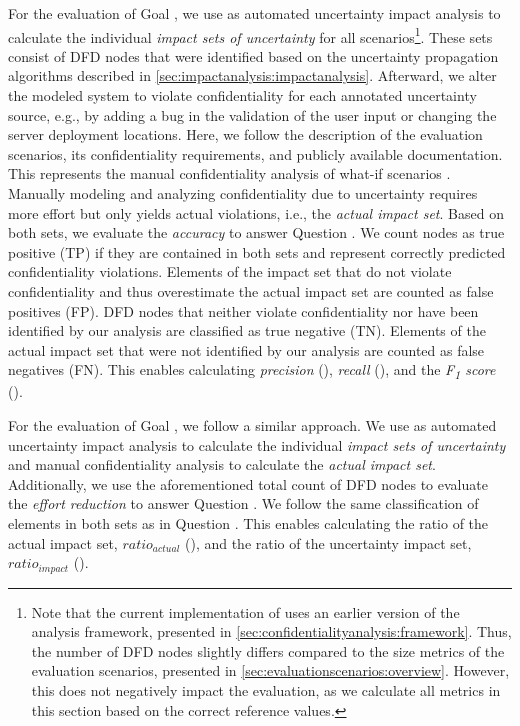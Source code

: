 For the evaluation of Goal , we use \uia as automated uncertainty impact analysis to calculate the individual \emph{impact sets of uncertainty} for all scenarios\footnote{Note that the current implementation of \uia uses an earlier version of the analysis framework, presented in \autoref{sec:confidentialityanalysis:framework}. Thus, the number of \ac{DFD} nodes slightly differs compared to the size metrics of the evaluation scenarios, presented in \autoref{sec:evaluationscenarios:overview}. However, this does not negatively impact the evaluation, as we calculate all metrics in this section based on the correct reference values.}.
These sets consist of \ac{DFD} nodes that were identified based on the uncertainty propagation algorithms described in \autoref{sec:impactanalysis:impactanalysis}.
Afterward, we alter the modeled system to violate confidentiality for each annotated uncertainty source, e.g., by adding a bug in the validation of the user input or changing the server deployment locations.
Here, we follow the description of the evaluation scenarios, its confidentiality requirements, and publicly available documentation.
This represents the manual confidentiality analysis of what-if scenarios \cite{seifermann_architectural_2022}.
Manually modeling and analyzing confidentiality due to uncertainty requires more effort \cite{hahner_model-based_2023} but only yields actual violations, i.e., the \emph{actual impact set}.
Based on both sets, we evaluate the \emph{accuracy} to answer Question .
We count nodes as true positive (TP) if they are contained in both sets and represent correctly predicted confidentiality violations. 
Elements of the impact set that do not violate confidentiality and thus overestimate the actual impact set are counted as false positives (FP). 
\ac{DFD} nodes that neither violate confidentiality nor have been identified by our analysis are classified as true negative (TN). 
Elements of the actual impact set that were not identified by our analysis are counted as false negatives (FN).
This enables calculating \emph{precision} (), \emph{recall} (), and the \emph{F\textsubscript{1} score} ().

For the evaluation of Goal , we follow a similar approach.
We use \uia as automated uncertainty impact analysis to calculate the individual \emph{impact sets of uncertainty} and manual confidentiality analysis \cite{seifermann_architectural_2022} to calculate the \emph{actual impact set}.
Additionally, we use the aforementioned total count of \ac{DFD} nodes to evaluate the \emph{effort reduction} to answer Question .
We follow the same classification of elements in both sets as in Question .
This enables calculating the ratio of the actual impact set, $ratio_{actual}$ (), and the ratio of the uncertainty impact set, $ratio_{impact}$ ().


